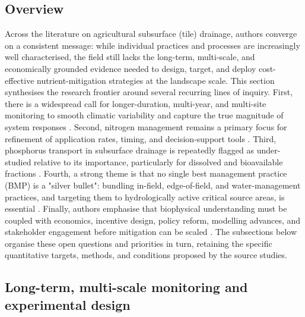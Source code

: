 \subsection{Overview}

Across the literature on agricultural subsurface (tile) drainage, authors converge on a consistent message: while individual practices and processes are increasingly well characterised, the field still lacks the long-term, multi-scale, and economically grounded evidence needed to design, target, and deploy cost-effective nutrient-mitigation strategies at the landscape scale. This section synthesises the research frontier around several recurring lines of inquiry. First, there is a widespread call for longer-duration, multi-year, and multi-site monitoring to smooth climatic variability and capture the true magnitude of system responses \parencite{Randall2003,Randall2005,Waring2024,Jeong2018,Cooke2012}. Second, nitrogen management remains a primary focus for refinement of application rates, timing, and decision-support tools \parencite{Christianson2015b,Bandura2025,Liu2021}. Third, phosphorus transport in subsurface drainage is repeatedly flagged as under-studied relative to its importance, particularly for dissolved and bioavailable fractions \parencite{Hertzberger2019,Yuan2022,deOliveira2022}. Fourth, a strong theme is that no single best management practice (BMP) is a "silver bullet": bundling in-field, edge-of-field, and water-management practices, and targeting them to hydrologically active critical source areas, is essential \parencite{Sunohara2016,Lenhart2016,Christianson2014,Baulch2019}. Finally, authors emphasise that biophysical understanding must be coupled with economics, incentive design, policy reform, modelling advances, and stakeholder engagement before mitigation can be scaled \parencite{Liu2021,Kvítek2023,David2015}. The subsections below organise these open questions and priorities in turn, retaining the specific quantitative targets, methods, and conditions proposed by the source studies.

\subsection{Long-term, multi-scale monitoring and experimental design}

